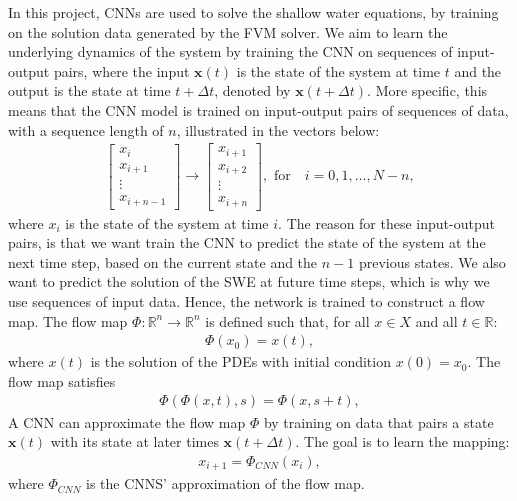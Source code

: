 In this project, CNNs are used to solve the shallow water equations, by training on the solution data generated by the FVM solver.
We aim to learn the underlying dynamics of the system by training the CNN on sequences of input-output pairs, where the input $\mathbf{x}(t)$ is the state of the system at time $t$ and the output is the state at time $t + \Delta t$, denoted by $\mathbf{x}(t + \Delta t)$.
More specific, this means that the CNN model is trained on input-output pairs of sequences of data, with a sequence length of $n$, illustrated in the vectors below:
\begin{align*}
    \begin{bmatrix}
        x_i \\ x_{i+1} \\ \vdots \\ x_{i+n-1}
    \end{bmatrix}
    \to
    \begin{bmatrix}
        x_{i+1} \\ x_{i+2} \\ \vdots \\ x_{i+n}
    \end{bmatrix},
    \text{ for} \quad i = 0, 1, \ldots, N-n,
\end{align*}
where $x_i$ is the state of the system at time $i$.
The reason for these input-output pairs, is that we want train the CNN to predict the state of the system at the next time step, based on the current state and the $n-1$ previous states.
We also want to predict the solution of the SWE at future time steps, which is why we use sequences of input data.
Hence, the network is trained to construct a flow map.
The flow map $\Phi: \mathbb{R}^n \rightarrow \mathbb{R}^n$ is defined such that, for all $x \in X$ and all $t \in \mathbb{R}$:
\begin{align*}
    \Phi(x_0) =  x(t),
\end{align*}
where $x(t)$ is the solution of the PDEs with initial condition $x(0) = x_0$.
The flow map satisfies
\begin{align*}
    \Phi(\Phi (x, t), s) = \Phi(x, s + t),
\end{align*}
A CNN can approximate the flow map $\Phi$ by training on data that pairs a state $\mathbf{x}(t)$ with its state at later times $\mathbf{x}(t + \Delta t)$.
The goal is to learn the mapping:
\begin{align*}
    x_{i+1} = \Phi_{CNN} (x_i), 
\end{align*}
where $\Phi_{CNN}$ is the CNNS' approximation of the flow map.

